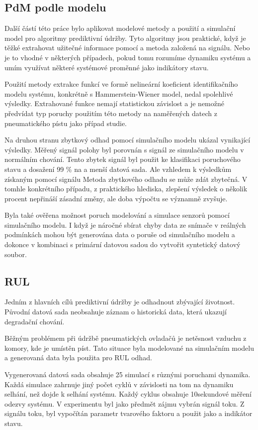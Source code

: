 \subsection{PdM podle modelu}

Další částí této práce bylo aplikovat modelové metody a použití a
simulační model pro algoritmy prediktivní údržby. Tyto algoritmy
jsou praktické, když je těžké extrahovat užitečné informace pomocí a
metoda založená na signálu. Nebo je to vhodné v některých případech, pokud tomu rozumíme
dynamiku systému a umím využívat některé systémové proměnné jako
indikátory stavu.

Použití metody extrakce funkcí ve formě nelineární
koeficient identifikačního modelu systému, konkrétně s
Hammerstein-Wiener model, nedal spolehlivé výsledky. Extrahované funkce
nemají statistickou závislost a je nemožné předvídat typ poruchy
použitím této metody na naměřených datech z pneumatického pístu jako případ
studie.

Na druhou stranu zbytkový odhad pomocí simulačního modelu
ukázal vynikající výsledky. Měřený signál polohy byl porovnán s
signál ze simulačního modelu v normálním chování. Tento zbytek
signál byl použit ke klasifikaci poruchového stavu a dosažení 99 \% na a
menší datová sada. Ale vzhledem k výsledkům získaným pomocí signálu
Metoda zbytkového odhadu se může zdát zbytečná. V tomhle
konkrétního případu, z praktického hlediska, zlepšení
výsledek o několik procent nepřináší zásadní změny, ale
doba výpočtu se významně zvyšuje.

Byla také ověřena možnost poruch modelování a simulace senzorů
pomocí simulačního modelu. I když je náročné sbírat chyby
data ze snímače v reálných podmínkách mohou být generována data o poruše
od simulačního modelu a dokonce v kombinaci s primární datovou sadou do
vytvořit syntetický datový soubor.

\subsection{RUL}

Jedním z hlavních cílů prediktivní údržby je odhadnout
zbývající životnost. Původní datová sada neobsahuje záznam o
historická data, která ukazují degradační chování.

Běžným problémem při údržbě pneumatických ovladačů je netěsnost
vzduchu z komory, kde je umístěn píst. Tato situace byla
modelované na simulačním modelu a generovaná data byla použita pro RUL
odhad.

Vygenerovaná datová sada obsahuje 25 simulací s různými poruchami
dynamika. Každá simulace zahrnuje jiný počet cyklů v závislosti na tom
na dynamiku selhání, než dojde k selhání systému. Každý cyklus
obsahuje 10sekundové měření odezvy systému. V
experimentu byl jako předmět zájmu vybrán signál toku. Z
signálu toku, byl vypočítán parametr tvarového faktoru a použit jako a
indikátor stavu.

